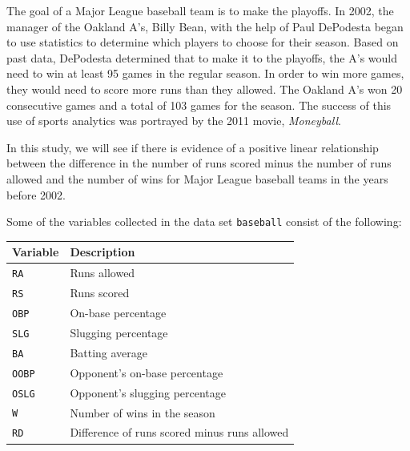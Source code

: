 \documentclass[
]{report}
\newenvironment{Shaded}{\begin{snugshade}}{\end{snugshade}}
\newcommand{\CommentTok}[1]{\textcolor[rgb]{0.56,0.35,0.01}{\textit{#1}}}
\newcommand{\DecValTok}[1]{\textcolor[rgb]{0.00,0.00,0.81}{#1}}
\newcommand{\FunctionTok}[1]{\textcolor[rgb]{0.00,0.00,0.00}{#1}}
\newcommand{\NormalTok}[1]{#1}
\newcommand{\OtherTok}[1]{\textcolor[rgb]{0.56,0.35,0.01}{#1}}
\newcommand{\SpecialCharTok}[1]{\textcolor[rgb]{0.00,0.00,0.00}{#1}}
\newcommand{\StringTok}[1]{\textcolor[rgb]{0.31,0.60,0.02}{#1}}
\begin{document}
The goal of a Major League baseball team is to make the playoffs. In 2002, the manager of the Oakland A's, Billy Bean, with the help of Paul DePodesta began to use statistics to determine which players to choose for their season. Based on past data, DePodesta determined that to make it to the playoffs, the A's would need to win at least 95 games in the regular season. In order to win more games, they would need to score more runs than they allowed. The Oakland A's won 20 consecutive games and a total of 103 games for the season. The success of this use of sports analytics was portrayed by the 2011 movie, \emph{Moneyball}.

In this study, we will see if there is evidence of a positive linear relationship between the difference in the number of runs scored minus the number of runs allowed and the number of wins for Major League baseball teams in the years before 2002.

Some of the variables collected in the data set \texttt{baseball} consist of the following:

\begin{longtable}[]{@{}ll@{}}
\toprule
\textbf{Variable} & \textbf{Description} \\
\midrule
\endhead
\texttt{RA} & Runs allowed \\
\texttt{RS} & Runs scored \\
\texttt{OBP} & On-base percentage \\
\texttt{SLG} & Slugging percentage \\
\texttt{BA} & Batting average \\
\texttt{OOBP} & Opponent's on-base percentage \\
\texttt{OSLG} & Opponent's slugging percentage \\
\texttt{W} & Number of wins in the season \\
\texttt{RD} & Difference of runs scored minus runs allowed \\
\bottomrule
\end{longtable}

\begin{Shaded}
\end{Shaded}
\end{document}
